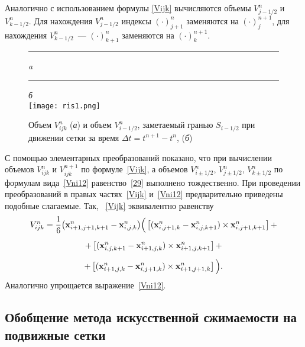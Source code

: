 Аналогично с использованием формулы \eqref{Vijk} вычисляются объемы $V^n_{j-1/2}$ и $V^n_{k-1/2}$. 
Для нахождения $V^n_{j-1/2}$ индексы $(\cdot)^{n}_{j+1}$ заменяются на $(\cdot)^{n+1}_{j}$, для
нахождения $V^n_{k-1/2}$~--- $(\cdot)^{n}_{k+1}$ заменяются на $(\cdot)^{n+1}_{k}$.

\begin{figure}[ht!]
  \label{fig1:1}
  \centering\small
  \rule{-15mm}{0mm}{\it a}\rule{80mm}{0mm}{\it б}\\[1.5mm]
  \texttt{[image: ris1.png]}%
  \caption{Объем $V^n_{ijk}$ (\emph{а}) и объем $V^n_{i-1/2}$, заметаемый гранью
           $S_{i-1/2}$ при движении сетки за время $\Delta t=t^{n+1}-t^{n}$, (\emph{б})}
\end{figure}

С помощью элементарных преобразований показано, что при вычислении объемов $V^n_{ijk}$ и $V^{n+1}_{ijk}$ по 
формуле~\eqref{Vijk}, а объемов $V^n_{i\pm 1/2}$, $V^n_{j\pm 1/2}$, $V^n_{k\pm 1/2}$ по формулам 
вида~\eqref{Vni12} равенство~\eqref{29} выполнено тождественно. При проведении преобразований в правых 
частях~\eqref{Vijk} и~\eqref{Vni12} предварительно приведены подобные слагаемые. Так, ~\eqref{Vijk}
эквивалентно равенству
\begin{gather}
  V^n_{ijk}={\displaystyle{\frac{1}{6}}}\big({\bf{x}}^n_{i+1,j+1,k+1}-{\bf{x}}^n_{i,j,k}\big)
  \Big(
  \left[({\bf{x}}^n_{i,j+1,k}-{\bf{x}}^n_{i,j,k+1})\times
        {\bf{x}}^n_{i,j+1,k+1}\right]+ \nonumber\\[2mm]
  +\left[({\bf{x}}^n_{i,j,k+1}-{\bf{x}}^n_{i+1,j,k})\times
        {\bf{x}}^n_{i+1,j,k+1}\right]+ \nonumber\\[2mm]
  +\left[({\bf{x}}^n_{i+1,j,k}-{\bf{x}}^n_{i,j+1,k})\times
        {\bf{x}}^n_{i+1,j+1,k}\right] \Big).  \nonumber
\end{gather}
Аналогично упрощается выражение~\eqref{Vni12}.

\subsection{Обобщение метода искусственной сжимаемости на подвижные сетки}
\label{s:125}
